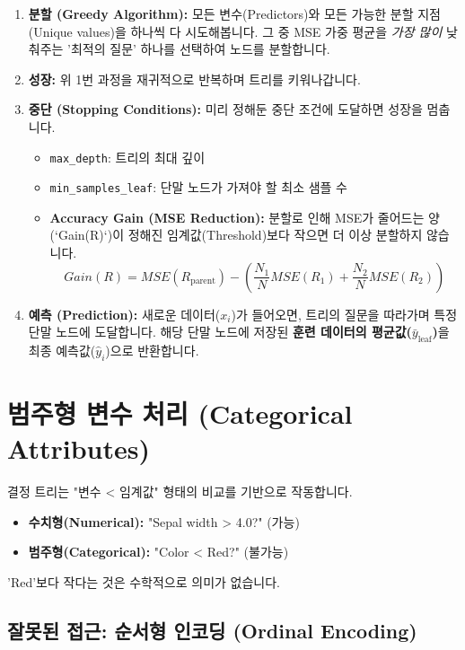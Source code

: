 \documentclass[11pt,a4paper]{book}
\theoremstyle{definition}
\begin{document}
\begin{enumerate}
    \item \textbf{분할 (Greedy Algorithm):}
    모든 변수(Predictors)와 모든 가능한 분할 지점(Unique values)을 하나씩 다 시도해봅니다.
    그 중 MSE 가중 평균을 \textit{가장 많이} 낮춰주는 '최적의 질문' 하나를 선택하여 노드를 분할합니다.

    \item \textbf{성장:}
    위 1번 과정을 재귀적으로 반복하며 트리를 키워나갑니다.

    \item \textbf{중단 (Stopping Conditions):}
    미리 정해둔 중단 조건에 도달하면 성장을 멈춥니다.
    \begin{itemize}
        \item \texttt{max\_depth}: 트리의 최대 깊이
        \item \texttt{min\_samples\_leaf}: 단말 노드가 가져야 할 최소 샘플 수
        \item \textbf{Accuracy Gain (MSE Reduction):} 분할로 인해 MSE가 줄어드는 양(`Gain(R)`)이 정해진 임계값(Threshold)보다 작으면 더 이상 분할하지 않습니다.
            $$ Gain(R) = MSE(R_{\text{parent}}) - \left( \frac{N_1}{N} MSE(R_1) + \frac{N_2}{N} MSE(R_2) \right) $$
    \end{itemize}
    
    \item \textbf{예측 (Prediction):}
    새로운 데이터($x_i$)가 들어오면, 트리의 질문을 따라가며 특정 단말 노드에 도달합니다.
    해당 단말 노드에 저장된 \textbf{훈련 데이터의 평균값($\bar{y}_{\text{leaf}}$)}을 최종 예측값($\hat{y}_i$)으로 반환합니다.
\end{enumerate}


\section{범주형 변수 처리 (Categorical Attributes)}

결정 트리는 "변수 < 임계값" 형태의 비교를 기반으로 작동합니다.
\begin{itemize}
    \item \textbf{수치형(Numerical):} "Sepal width > 4.0?" (가능)
    \item \textbf{범주형(Categorical):} "Color < Red?" (불가능)
\end{itemize}
'Red'보다 작다는 것은 수학적으로 의미가 없습니다.

\subsection{잘못된 접근: 순서형 인코딩 (Ordinal Encoding)}
\end{document}
